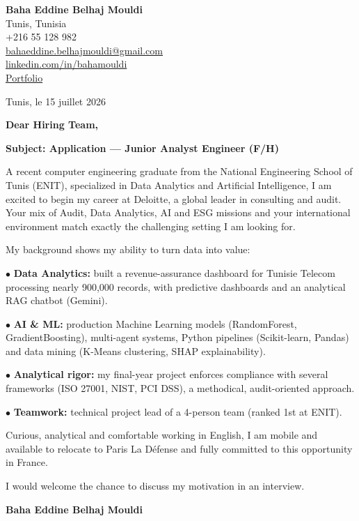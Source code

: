 \documentclass[a4paper,11pt]{article}
\begin{document}
\begin{flushright}
{\bfseries Baha Eddine Belhaj Mouldi}\\
Tunis, Tunisia\\
+216 55 128 982\\
\href{mailto:bahaeddine.belhajmouldi@gmail.com}{bahaeddine.belhajmouldi@gmail.com}\\
\href{https://linkedin.com/in/bahamouldi}{linkedin.com/in/bahamouldi}\\
\href{https://bahamouldi.github.io/portfolio/}{Portfolio}
\end{flushright}

\vspace{0.8cm}

\begin{flushleft}
Tunis, le 15 juillet 2026

\vspace{0.8cm}

{\bfseries Dear Hiring Team,}

\vspace{0.6cm}

{\bfseries Subject: Application --- Junior Analyst Engineer (F/H)}
\end{flushleft}

\vspace{0.6cm}

A recent computer engineering graduate from the National Engineering School of Tunis (ENIT), specialized in Data Analytics and Artificial Intelligence, I am excited to begin my career at Deloitte, a global leader in consulting and audit. Your mix of Audit, Data Analytics, AI and ESG missions and your international environment match exactly the challenging setting I am looking for.

My background shows my ability to turn data into value:

$\bullet$ \textbf{Data Analytics:} built a revenue-assurance dashboard for Tunisie Telecom processing nearly 900,000 records, with predictive dashboards and an analytical RAG chatbot (Gemini).

$\bullet$ \textbf{AI \& ML:} production Machine Learning models (RandomForest, GradientBoosting), multi-agent systems, Python pipelines (Scikit-learn, Pandas) and data mining (K-Means clustering, SHAP explainability).

$\bullet$ \textbf{Analytical rigor:} my final-year project enforces compliance with several frameworks (ISO 27001, NIST, PCI DSS), a methodical, audit-oriented approach.

$\bullet$ \textbf{Teamwork:} technical project lead of a 4-person team (ranked 1st at ENIT).

Curious, analytical and comfortable working in English, I am mobile and available to relocate to Paris La D\'{e}fense and fully committed to this opportunity in France.

I would welcome the chance to discuss my motivation in an interview.

\vspace{0.8cm}

\begin{flushright}
{\bfseries Baha Eddine Belhaj Mouldi}
\end{flushright}
\end{document}
